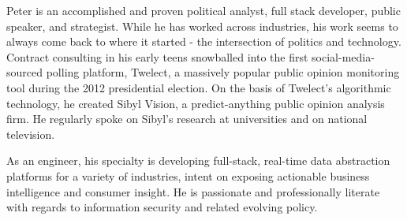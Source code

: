 
\begin{cvparagraph}
Peter is an accomplished and proven political analyst, full stack developer, public speaker, and strategist. While he has worked across industries, his work seems to always come back to where it started - the intersection of politics and technology. Contract consulting in his early teens snowballed into the first social-media-sourced polling platform, Twelect, a massively popular public opinion monitoring tool during the 2012 presidential election. On the basis of Twelect's algorithmic technology, he created Sibyl Vision, a predict-anything public opinion analysis firm. He regularly spoke on Sibyl's research at universities and on national television.

As an engineer, his specialty is developing full-stack, real-time data abstraction platforms for a variety of industries, intent on exposing actionable business intelligence and consumer insight. He is passionate and professionally literate with regards to information security and related evolving policy.
\end{cvparagraph}
